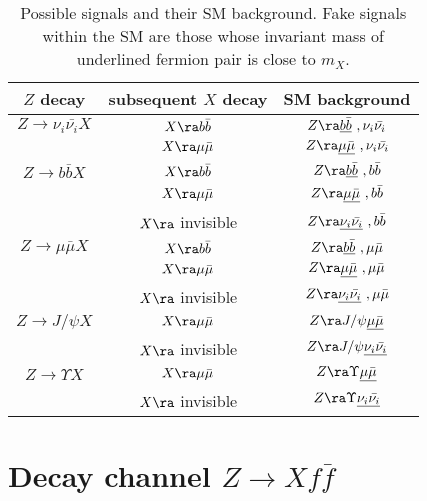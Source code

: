\documentclass[11pt]{article}
\begin{document}
\begin{table}[ht!]
\centering
\renewcommand{\arraystretch}{1.45}
\begin{tabular}{|c|c|c|}
  \hline
  $Z$ decay &  subsequent $X$ decay  & SM background  \\
  \hline
  $Z\to \nu_i\bar{\nu_i} X $ & $X\ra b\bar{b}$ & $Z\ra \underline{b\bar{b}}\ , \nu_i\bar{\nu_i} $ \\
                             & $X\ra \mu\bar{\mu}$ & $Z\ra \underline{\mu\bar{\mu}}\ , \nu_i\bar{\nu_i} $ \\
 \hline
  $Z\to b\bar{b} X $ & $X\ra b\bar{b}$ & $Z\ra \underline{b\bar{b}}\ ,  b\bar{b} $ \\
                     & $X\ra \mu\bar{\mu}$ & $Z\ra \underline{\mu\bar{\mu}}\ ,  b\bar{b} $ \\
                     & $X\ra$ invisible  & $Z\ra \underline{\nu_i\bar{\nu_i}}\ ,  b\bar{b} $ \\
 \hline
  $Z\to \mu\bar{\mu} X $ & $X\ra b\bar{b}$ & $Z\ra \underline{b\bar{b}}\ ,  \mu\bar{\mu} $ \\
                     & $X\ra \mu\bar{\mu}$ & $Z\ra \underline{\mu\bar{\mu}}\ ,  \mu\bar{\mu} $ \\
                     & $X\ra$ invisible  & $Z\ra \underline{\nu_i\bar{\nu_i}}\ ,  \mu\bar{\mu} $ \\
  \hline
  $Z\to J/\psi  X $  & $X\ra \mu\bar{\mu}$ & $Z\ra J/\psi \underline{\mu\bar{\mu}} $ \\
                     & $X\ra$ invisible  & $Z\ra J/\psi \underline{\nu_i\bar{\nu_i}} $ \\
  \hline
   $Z\to \Upsilon  X $  & $X\ra \mu\bar{\mu}$ & $Z\ra \Upsilon\underline{\mu\bar{\mu}} $ \\
                     & $X\ra$ invisible  & $Z\ra \Upsilon \underline{\nu_i\bar{\nu_i}} $ \\
  \hline
\end{tabular}
  \caption{Possible signals and their SM background. Fake signals within the SM are those whose invariant mass of underlined fermion pair is close to $m_X$.}
\label{tab:SMBG}
\end{table}
\section{Decay channel $Z\to X f\bar{f}$}\label{sec:1stdecay}
\end{document}
